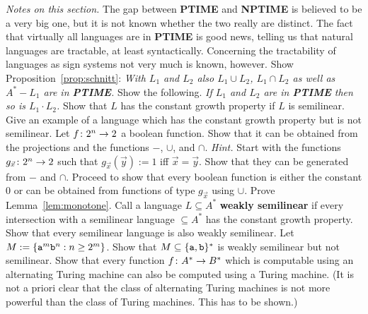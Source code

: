 {\it Notes on this section.} The gap between \textbf{PTIME} and 
\textbf{NPTIME} is believed to be 
a very big one, but it is not known whether the two really are 
distinct. The fact that virtually all languages are in 
\textbf{PTIME} is good news, telling us that natural languages 
are tractable, at least syntactically. Concerning the tractability 
of languages as sign systems not very much is known, however. 
\vplatz
\exercise
Show Proposition~\ref{prop:schnitt}:
{\it With $L_1$ and $L_2$ also $L_1 \cup L_2$, $L_1 \cap L_2$
as well as $A^{\ast} - L_1$ are in \textbf{PTIME}.}
\vplatz
\exercise
Show the following. {\it If $L_1$ and $L_2$ are in \textbf{PTIME}
then so is $L_1 \cdot L_2$.}
\vplatz
\exercise
Show that $L$ has the constant growth property if $L$ is semilinear.
Give an example of a language which has the constant growth property
but is not semilinear.
\vplatz
\exercise
\label{exercise:basis}
Let $f \colon 2^n \rightarrow 2$ a boolean function. Show that it can be obtained
from the projections and the functions $-$, $\cup$, and $\cap$.
{\it Hint.} Start with the functions $g_{\vec{x}} \colon 2^n \rightarrow 2$ such that
$g_{\vec{x}}(\vec{y}) := 1$ iff $\vec{x} = \vec{y}$.
Show that they can be generated from $-$ and $\cap$. Proceed
to show that every boolean function is either the constant $0$
or can be obtained from functions of type $g_{\vec{x}}$ using
$\cup$.
\vplatz
\exercise
Prove Lemma~\ref{lem:monotone}.
\vplatz
\exercise
Call a language $L \subseteq A^{\ast}$ \textbf{weakly semilinear} if
every intersection with a semilinear language $\subseteq A^{\ast}$
has the constant growth property. Show that every semilinear language
is also weakly semilinear. Let $M := \{\mbox{\tt a}^m
\mbox{\tt b}^n : n \geq 2^m\}$. Show that $M \subseteq \{\mbox{\tt a},
\mbox{\tt b}\}^{\ast}$ is weakly semilinear but not semilinear.
\vplatz
\exercise
Show that every function $f \colon A^{\ast} \rightarrow B^{\ast}$ which is
computable using an alternating Turing machine can also be computed
using a Turing machine. (It is not a priori clear that
the class of alternating Turing machines is not more powerful
than the class of Turing machines. This has to be shown.)
